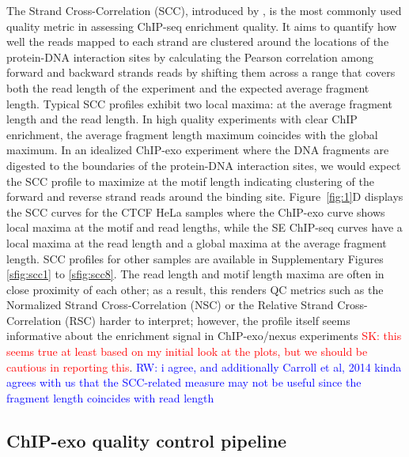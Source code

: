 \documentclass{bmcart}
\newcommand{\SK}[1]{\textcolor{red}{SK: #1}}
\newcommand{\RW}[1]{\textcolor{blue}{RW: #1}}
\begin{document}
The Strand Cross-Correlation (SCC), introduced by \cite{strandcc}, is the most commonly used quality metric in assessing 
ChIP-seq enrichment quality. It aims to quantify  how well the reads mapped to each
strand are clustered around the locations of the protein-DNA interaction sites by calculating the Pearson correlation among forward and backward strands reads by shifting them across a range that covers both the read length of the experiment and the expected average fragment length.
Typical SCC profiles exhibit two local maxima: at the average fragment length and the read length. In high quality experiments with clear ChIP enrichment, the average fragment length maximum coincides with the global maximum.
In an idealized ChIP-exo experiment where the DNA fragments are
digested to the boundaries of the protein-DNA interaction sites, we
would expect the SCC profile to maximize at the motif length
indicating clustering of the forward and reverse strand reads around
the binding site. Figure~\ref{fig:1}D displays the SCC curves for the
CTCF HeLa samples where the ChIP-exo curve shows local maxima at the
motif and read lengths, while the SE ChIP-seq curves have a local
maxima at the read length and a global maxima at the average fragment
length. SCC profiles for other samples are available in Supplementary
Figures \ref{sfig:scc1} to \ref{sfig:scc8}. The read length and motif
length maxima are often in close proximity of each other; as a result,
this renders QC metrics such as the Normalized Strand
Cross-Correlation (NSC) or the Relative Strand Cross-Correlation (RSC)
harder to interpret; however, the profile itself seems informative
about the enrichment signal in ChIP-exo/nexus experiments \SK{this
  seems true at least based on my initial look at the plots, but we
  should be cautious in reporting this}. \RW{i agree, and additionally
  Carroll et al, 2014 kinda agrees with us that the SCC-related
  measure may not be useful since the fragment length coincides with
  read length}



\subsection*{ChIP-exo quality control pipeline}
\end{document}
